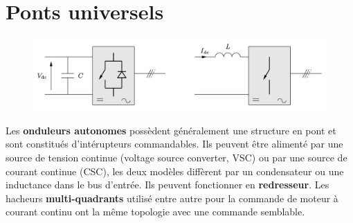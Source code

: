 
\chapter{Ponts universels}
	\begin{figure}
	\vspace{-5mm}
	\includegraphics[scale=0.2]{ch4/1}
	\end{figure}
	Les \textbf{onduleurs autonomes} possèdent généralement une structure en pont et sont constitués d'intérupteurs commandables. Ils peuvent être alimenté par une source de tension continue (voltage source converter, VSC) ou par une source de courant continue (CSC), les deux modèles diffèrent par un condensateur ou une inductance dans le bus d'entrée. Ils peuvent fonctionner en \textbf{redresseur}. Les hacheurs \textbf{multi-quadrants} utilisé entre autre pour la commande de moteur à courant continu ont la même topologie avec une commande semblable. 
	
